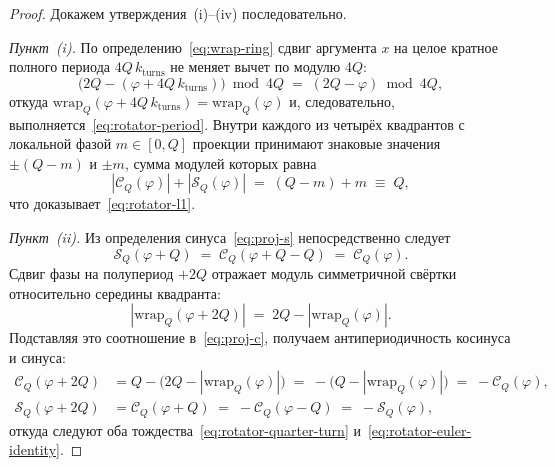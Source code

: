 \documentclass[11pt,a4paper]{article}
\theoremstyle{plain}
\theoremstyle{definition}
\begin{document}
\begin{proof}
Докажем утверждения~(i)--(iv) последовательно.

\emph{Пункт~(i).} По определению~\eqref{eq:wrap-ring} сдвиг аргумента $x$ на целое кратное полного периода $4Q\,k_{\mathrm{turns}}$ не меняет вычет по модулю $4Q$:
\begin{equation*}
  \bigl(2Q - (\varphi + 4Q\,k_{\mathrm{turns}})\bigr) \bmod 4Q \;=\; (2Q - \varphi) \bmod 4Q,
\end{equation*}
откуда $\mathrm{wrap}_Q(\varphi + 4Q\,k_{\mathrm{turns}}) = \mathrm{wrap}_Q(\varphi)$ и, следовательно, выполняется~\eqref{eq:rotator-period}. Внутри каждого из четырёх квадрантов с локальной фазой $m \in [0, Q]$ проекции принимают знаковые значения $\pm(Q - m)$ и $\pm m$, сумма модулей которых равна
\begin{equation*}
  |\mathcal{C}_Q(\varphi)| + |\mathcal{S}_Q(\varphi)| \;=\; (Q - m) + m \;\equiv\; Q,
\end{equation*}
что доказывает~\eqref{eq:rotator-l1}.

\emph{Пункт~(ii).} Из определения синуса~\eqref{eq:proj-s} непосредственно следует
\begin{equation*}
  \mathcal{S}_Q(\varphi + Q) \;=\; \mathcal{C}_Q(\varphi + Q - Q) \;=\; \mathcal{C}_Q(\varphi).
\end{equation*}
Сдвиг фазы на полупериод $+2Q$ отражает модуль симметричной свёртки относительно середины квадранта:
\begin{equation*}
  |\mathrm{wrap}_Q(\varphi + 2Q)| \;=\; 2Q - |\mathrm{wrap}_Q(\varphi)|.
\end{equation*}
Подставляя это соотношение в~\eqref{eq:proj-c}, получаем антипериодичность косинуса и синуса:
\begin{align*}
  \mathcal{C}_Q(\varphi + 2Q) &= Q - \bigl(2Q - |\mathrm{wrap}_Q(\varphi)|\bigr) \;=\; -\bigl(Q - |\mathrm{wrap}_Q(\varphi)|\bigr) \;=\; -\mathcal{C}_Q(\varphi), \\
  \mathcal{S}_Q(\varphi + 2Q) &= \mathcal{C}_Q(\varphi + Q) \;=\; -\mathcal{C}_Q(\varphi - Q) \;=\; -\mathcal{S}_Q(\varphi),
\end{align*}
откуда следуют оба тождества~\eqref{eq:rotator-quarter-turn} и~\eqref{eq:rotator-euler-identity}.


\end{proof}
\end{document}
